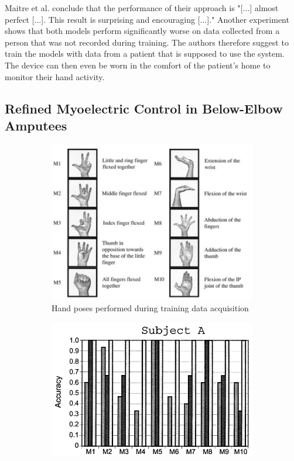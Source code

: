 \documentclass[hyperref, bachelorofscience]{cgvpub}
\begin{document}
Maitre et al. conclude that the performance of their approach is "[$\dots$] almost perfect [$\dots$]. This result is surprising and encouraging [$\dots$]." Another experiment shows that both models perform significantly worse on data collected from a person that was not recorded during training. The authors therefore suggest to train the models with data from a patient that is supposed to use the system. The device can then even be worn in the comfort of the patient's home to monitor their hand activity.

\subsection{Refined Myoelectric Control in Below-Elbow Amputees}
\begin{figure}
	\centering
	\begin{subfigure}{.35\linewidth}
		\includegraphics[width=\linewidth]{../pics/amputees_poses}
		\caption{Hand poses performed during training data acquisition}
		\label{fig:amputees:poses}
	\end{subfigure}
	\hfill
	\begin{subfigure}{.3\linewidth}
		\includegraphics[width=\linewidth]{../pics/amputees_a}

\end{subfigure}
\end{figure}
\end{document}
